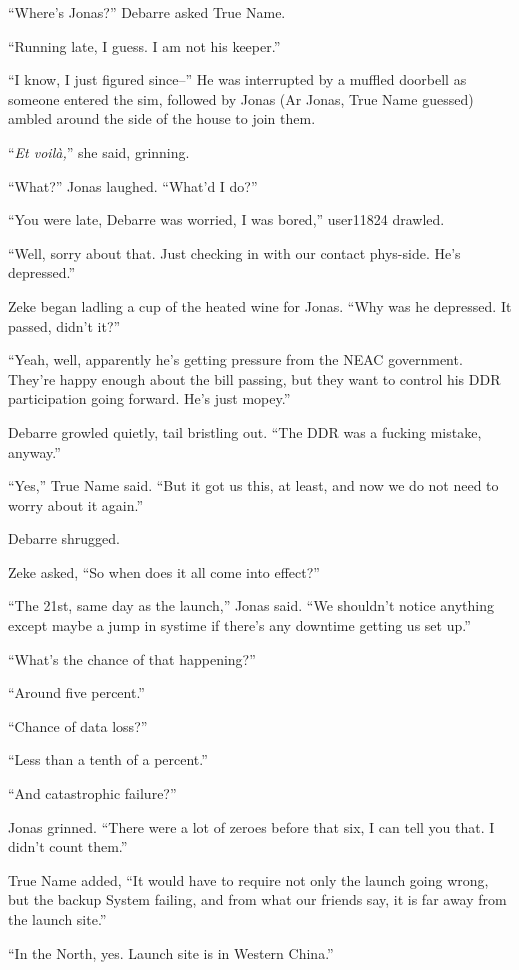 ``Where's Jonas?'' Debarre asked True Name.

``Running late, I guess. I am not his keeper.''

``I know, I just figured since--'' He was interrupted by a muffled doorbell as someone entered the sim, followed by Jonas (Ar Jonas, True Name guessed) ambled around the side of the house to join them.

``\emph{Et voilà,}'' she said, grinning.

``What?'' Jonas laughed. ``What'd I do?''

``You were late, Debarre was worried, I was bored,'' user11824 drawled.

``Well, sorry about that. Just checking in with our contact phys-side. He's depressed.''

Zeke began ladling a cup of the heated wine for Jonas. ``Why was he depressed. It passed, didn't it?''

``Yeah, well, apparently he's getting pressure from the NEAC government. They're happy enough about the bill passing, but they want to control his DDR participation going forward. He's just mopey.''

Debarre growled quietly, tail bristling out. ``The DDR was a fucking mistake, anyway.''

``Yes,'' True Name said. ``But it got us this, at least, and now we do not need to worry about it again.''

Debarre shrugged.

Zeke asked, ``So when does it all come into effect?''

``The 21st, same day as the launch,'' Jonas said. ``We shouldn't notice anything except maybe a jump in systime if there's any downtime getting us set up.''

``What's the chance of that happening?''

``Around five percent.''

``Chance of data loss?''

``Less than a tenth of a percent.''

``And catastrophic failure?''

Jonas grinned. ``There were a lot of zeroes before that six, I can tell you that. I didn't count them.''

True Name added, ``It would have to require not only the launch going wrong, but the backup System failing, and from what our friends say, it is far away from the launch site.''

``In the North, yes. Launch site is in Western China.''

